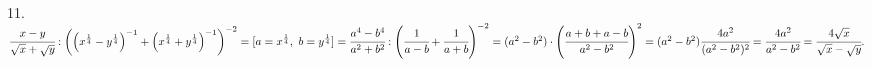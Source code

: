 11. $\cfrac{x-y}{\sqrt{x}+\sqrt{y}}:\left(\left(x^\frac{1}{4}-y^\frac{1}{4}\right)^{-1}+\left(x^\frac{1}{4}+y^\frac{1}{4}\right)^{-1}\right)^{-2}=[a=x^{\frac{1}{4}},\ b=y^\frac{1}{4}]=\cfrac{a^4-b^4}{a^2+b^2}:\left(\cfrac{1}{a-b}+\cfrac{1}{a+b}\right)^{-2}=
(a^2-b^2)\cdot\left(\cfrac{a+b+a-b}{a^2-b^2}\right)^{2}=(a^2-b^2)\cfrac{4a^2}{(a^2-b^2)^2}=\cfrac{4a^2}{a^2-b^2}=\cfrac{4\sqrt{x}}{\sqrt{x}-\sqrt{y}}.$\\
